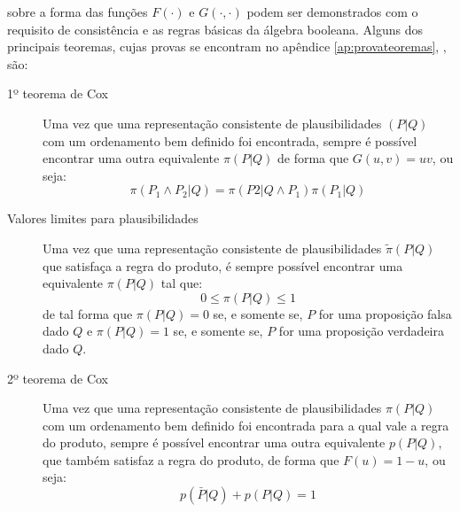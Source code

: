  sobre a forma das funções $F(\cdot)$ e $G(\cdot,\cdot)$ podem ser demonstrados com o requisito de consistência e as regras básicas da álgebra booleana. Alguns dos principais teoremas, cujas provas se encontram no apêndice \ref{ap:provateoremas}, \emph{}, são:
\begin{description}
 \item[1º teorema de Cox]
\begin{Teorema}
    Uma vez que uma representação consistente de plausibilidades $(P|Q)$ com um ordenamento bem definido foi encontrada, sempre é possível encontrar uma outra equivalente $\pi(P|Q)$ de forma que $G(u,v) = uv$, ou seja:
    \begin{equation}
	\label{eq:productrule}
	\pi(P_1\wedge P_2|Q) = \pi(P2 | Q \wedge P_1) \pi(P_1| Q)
    \end{equation}
\end{Teorema}

\item[Valores limites para plausibilidades]
\begin{Teorema}
  Uma vez que uma representação consistente de plausibilidades $\tilde{\pi}(P|Q)$ que satisfaça a regra do produto, é sempre possível encontrar uma equivalente $\pi(P|Q)$ tal que:
 \begin{equation}
    0 \le \pi(P|Q) \le 1
 \end{equation}
 de tal forma que $\pi(P|Q) = 0$ se, e somente se, $P$ for uma proposição falsa dado $Q$ e $\pi(P|Q) = 1$ se, e somente se, $P$ for uma proposição verdadeira dado $Q$.
\end{Teorema}
\item[2º teorema de Cox]
\begin{Teorema}
 Uma vez que uma representação consistente de plausibilidades $\pi(P|Q)$ com um ordenamento bem definido foi encontrada para a qual vale a regra do produto, sempre é possível encontrar uma outra equivalente $p(P|Q)$, que também satisfaz a regra do produto, de forma que $F(u) = 1 - u$, ou seja:
 \begin{equation}
 \label{eq:normed}
 p(\bar{P} | Q) + p(P|Q) = 1
 \end{equation}
\end{Teorema}
\end{description}

